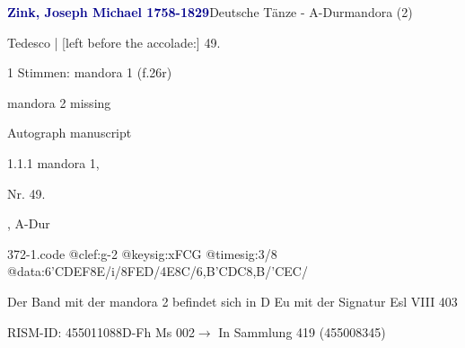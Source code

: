 \documentclass[twocolumn, 12pt]{book}
\begin{document}
\par \vspace{16pt} \textcolor{darkblue}{\textbf{Zink, Joseph Michael  1758-1829}}\hfillplus{\textbf{[372]}}\newline Deutsche Tänze - A-Dur\newline mandora (2)
\par \begin{itshape}[f.26r, at left:] Tedesco | [left before the accolade:] 49.\end{itshape} 
\par \textcolor{darkblue}{}  1 Stimmen: mandora 1  (f.26r)\newline \begin{small} mandora 2 missing\end{small} \newline Autograph manuscript
\par 1.1.1  mandora 1, \begin{itshape}Nr. 49.\end{itshape}, A-Dur  
\begin{filecontents*}{372-1.code}
@clef:g-2
@keysig:xFCG
@timesig:3/8
@data:{6'CDEF}8E/i/8FED/4E8C/{6,B'CDC}8,B/'CEC/
\end{filecontents*}
\newline %
\par Der Band mit der mandora 2 befindet sich in D Eu mit der Signatur Esl VIII 403
\par RISM-ID: 455011088\newline D-Fh  Ms 002\newline $\rightarrow$ In Sammlung 419 (455008345)
      
\end{document}
